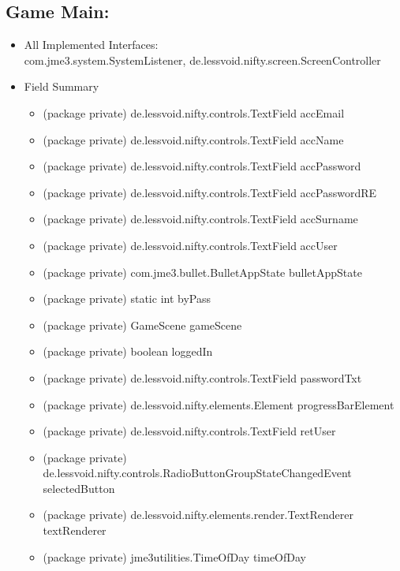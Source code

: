 \documentclass[letterpaper]{article}
\begin{document}
					\subsection*{Game Main:}
					\vspace{0.1in}
						
						\begin{itemize}
							\item 	All Implemented Interfaces: \\
									com.jme3.system.SystemListener, de.lessvoid.nifty.screen.ScreenController
							\item	Field Summary
									\begin{itemize}
										\item	(package private) de.lessvoid.nifty.controls.TextField	accEmail 
										\item	(package private) de.lessvoid.nifty.controls.TextField	accName 
										\item	(package private) de.lessvoid.nifty.controls.TextField	accPassword 
										\item	(package private) de.lessvoid.nifty.controls.TextField	accPasswordRE 
										\item	(package private) de.lessvoid.nifty.controls.TextField	accSurname 
										\item	(package private) de.lessvoid.nifty.controls.TextField	accUser 
										\item	(package private) com.jme3.bullet.BulletAppState	bulletAppState 
										\item	(package private) static int	byPass 
										\item	(package private) GameScene	gameScene 
										\item	(package private) boolean	loggedIn 
										\item	(package private) de.lessvoid.nifty.controls.TextField	passwordTxt 
										\item	(package private) de.lessvoid.nifty.elements.Element	progressBarElement 
										\item	(package private) de.lessvoid.nifty.controls.TextField	retUser 
										\item	(package private) de.lessvoid.nifty.controls.RadioButtonGroupStateChangedEvent	selectedButton 
										\item	(package private) de.lessvoid.nifty.elements.render.TextRenderer	textRenderer 
										\item	(package private) jme3utilities.TimeOfDay	timeOfDay 

\end{itemize}
\end{itemize}
\end{document}
